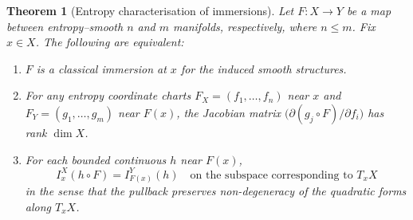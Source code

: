 \documentclass[11pt]{amsart}
\newtheorem{theorem}{Theorem}[section]
\theoremstyle{definition}
\theoremstyle{remark}
\begin{document}
\begin{theorem}[Entropy characterisation of immersions]
\label{thm:immersion}
Let $F:X\to Y$ be a map between entropy--smooth $n$ and $m$ manifolds, respectively, where $n\leq m$. Fix $x\in X$.  The following are equivalent:

\begin{enumerate}
\item[(i)] $F$ is a classical immersion at $x$ for the induced smooth
structures.
\item[(ii)] For any entropy coordinate charts
$F_X=(f_1,\dots,f_n)$ near $x$ and
$F_Y=(g_1,\dots,g_m)$ near $F(x)$, the Jacobian matrix
$\bigl(\partial (g_j\circ F)/\partial f_i\bigr)$ has rank $\dim X$.
\item[(iii)] For each bounded continuous $h$ near $F(x)$,
\[
I^X_x(h\circ F) = I^Y_{F(x)}(h)
\quad\text{on the subspace corresponding to }T_xX
\]
in the sense that the pullback preserves non-degeneracy of the quadratic
forms along $T_xX$.
\end{enumerate}
\end{theorem}
\end{document}
